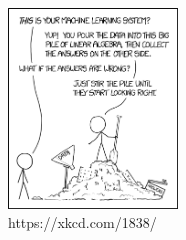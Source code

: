 \begin{frame}{}
    \begin{figure}
        \centering
        \includegraphics[width=0.4\textwidth]{xkcd}
        \caption{https://xkcd.com/1838/}
    \end{figure}
\end{frame}